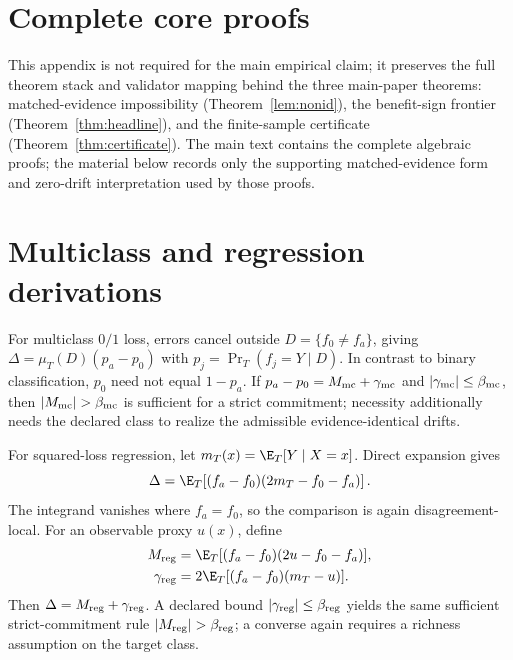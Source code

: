 \section{Complete core proofs}\label{app:theory-full}
This appendix is not required for the main empirical claim; it preserves the full theorem stack
and validator mapping behind the three main-paper theorems: matched-evidence impossibility
(Theorem~\ref{lem:nonid}), the benefit-sign frontier (Theorem~\ref{thm:headline}), and the
finite-sample certificate (Theorem~\ref{thm:certificate}).
The main text contains the complete algebraic proofs; the material below records only the supporting
matched-evidence form and zero-drift interpretation used by those proofs.







\section{Multiclass and regression derivations}\label{app:regression}
For multiclass $0/1$ loss, errors cancel outside $D=\{f_0\neq f_a\}$, giving
$\Delta=\mu_T(D)(p_a-p_0)$ with $p_j=\Pr_T(f_j=Y\mid D)$. In contrast to binary classification,
$p_0$ need not equal $1-p_a$. If $p_a-p_0=M_{\rm mc}+\gamma_{\rm mc}$ and
$|\gamma_{\rm mc}|\le\beta_{\rm mc}$, then $|M_{\rm mc}|>\beta_{\rm mc}$ is sufficient for a
strict commitment; necessity additionally needs the declared class to realize the admissible
evidence-identical drifts.

For squared-loss regression, let $m_T(x)=\E_T[Y\mid X=x]$. Direct expansion gives
\[
\Delta=\E_T\!\left[(f_a-f_0)(2m_T-f_0-f_a)\right].
\]
The integrand vanishes where $f_a=f_0$, so the comparison is again disagreement-local. For an
observable proxy $u(x)$, define
\begin{align*}
M_{\rm reg}&=\E_T[(f_a-f_0)(2u-f_0-f_a)],\\
\gamma_{\rm reg}&=2\E_T[(f_a-f_0)(m_T-u)].
\end{align*}
Then $\Delta=M_{\rm reg}+\gamma_{\rm reg}$. A declared bound
$|\gamma_{\rm reg}|\le\beta_{\rm reg}$ yields the same sufficient strict-commitment rule
$|M_{\rm reg}|>\beta_{\rm reg}$; a converse again requires a richness assumption on the target class.

